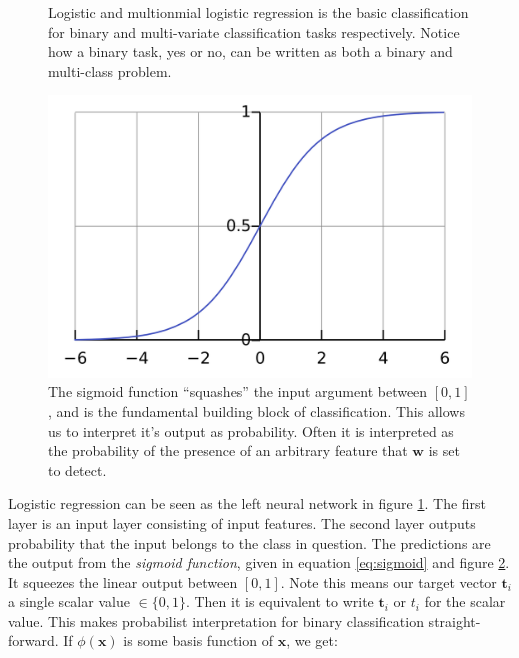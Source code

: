 \message{ !name(main.tex)}\documentclass[11pt]{article}
\begin{document}
\begin{minipage}{0.52\textwidth}
  \begin{figure}[H]
    
    \caption{Logistic and multionmial logistic regression is the basic classification for binary and multi-variate classification tasks respectively. Notice how a binary task, yes or no, can be written as both a binary and multi-class problem.}
    \label{fig:logit_nn}
  \end{figure}
\end{minipage}\hfill
\begin{minipage}{0.42\textwidth}
  \begin{figure}[H]
    \includegraphics[width=\linewidth]{sigmoid}
    \caption{The sigmoid function ``squashes'' the input argument between $[0,1]$, and is the fundamental building block of classification. This allows us to interpret it's output as probability. Often it is interpreted as the probability of the presence of an arbitrary feature that $\mathbf{w}$ is set to detect.}
    \label{fig:sigmoid}
  \end{figure}
\end{minipage}
\vspace{0.25cm}

Logistic regression can be seen as the left neural network in figure \ref{fig:logit_nn}. The first layer is an input layer consisting of input features. The second layer outputs probability that the input belongs to the class in question. The predictions are the output from the \emph{sigmoid function}, given in equation \ref{eq:sigmoid} and figure \ref{fig:sigmoid}. It squeezes the linear output between $[0,1]$. Note this means our target vector $\mathbf{t}_{i}$ a single scalar value $\in\{0,1\}$. Then it is equivalent to write $\mathbf{t}_{i}$ or $t_{i}$ for the scalar value. This makes probabilist interpretation for binary classification straight-forward. If $\phi(\mathbf{x})$ is some basis function of $\mathbf{x}$, we get: 
\end{document}
